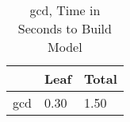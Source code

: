 \begin{table}
\centering
\caption{gcd, Time in Seconds to Build Model}
\label{gcd_model_time}
\begin{tabular}{lll}
\toprule
{} &  Leaf & Total \\
\midrule
gcd &  0.30 &  1.50 \\
\bottomrule
\end{tabular}
\end{table}
